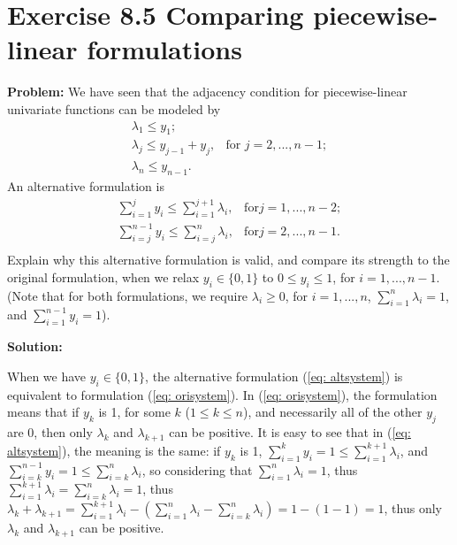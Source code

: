 \section{Exercise 8.5 Comparing piecewise-linear formulations}
\textbf{Problem:} We have seen that the adjacency condition for piecewise-linear univariate functions can be modeled by
\begin{equation}
\label{eq: orisystem}
  \begin{array}{lrcll}
    \lambda_1\leq{}y_1; &\\
    \lambda_j\leq{}y_{j-1}+y_j, & \text{for } j=2,...,n-1;\\
    \lambda_n\leq{}y_{n-1}. &
  \end{array}
\end{equation}
An alternative formulation is
\begin{equation}
\label{eq: altsystem}
  \begin{array}{lrcll}
   \sum_{i=1}^{j} y_i\leq{}\sum_{i=1}^{j+1} \lambda_i, & \text{for} j=1,...,n-2;\\
   \sum_{i=j}^{n-1} y_i\leq{}\sum_{i=j}^{n} \lambda_i, & \text{for} j=2,...,n-1.\\
  \end{array}
\end{equation}
Explain why this alternative formulation is valid, and compare its strength to the original formulation, when we relax $y_i\in\lbrace0,1\rbrace$ to $0\leq{}y_i\leq1$, for $i=1,...,n−1$. (Note that for both formulations, we require $\lambda_i\geq0$, for $i=1,...,n$, $\sum_{i=1}^{n} \lambda_i=1$, and
$\sum_{i=1}^{n-1} y_i=1$).

\textbf{Solution:} 

When we have $y_i\in\lbrace0,1\rbrace$, the alternative formulation (\ref{eq: altsystem}) is equivalent to formulation (\ref{eq: orisystem}). In (\ref{eq: orisystem}), the formulation means that if $y_k$ is 1, for some $k$ ($1\leq{}k\leq{}n$), and necessarily all of the other $y_j$ are 0, then only $\lambda_k$ and $\lambda_{k+1}$ can be positive. It is easy to see that in (\ref{eq: altsystem}), the meaning is the same: if $y_k$ is 1, $ \sum_{i=1}^{k} y_i=1\leq{}\sum_{i=1}^{k+1} \lambda_i$, and $\sum_{i=k}^{n-1} y_i=1\leq{}\sum_{i=k}^{n} \lambda_i$, so considering that $\sum_{i=1}^{n} \lambda_i=1$, thus $\sum_{i=1}^{k+1} \lambda_i=\sum_{i=k}^{n} \lambda_i=1$, thus $\lambda_k + \lambda_{k+1}=\sum_{i=1}^{k+1} \lambda_i - (\sum_{i=1}^{n} \lambda_i-\sum_{i=k}^{n} \lambda_i)=1-(1-1)=1$, thus only $\lambda_k$ and $\lambda_{k+1}$ can be positive. 

